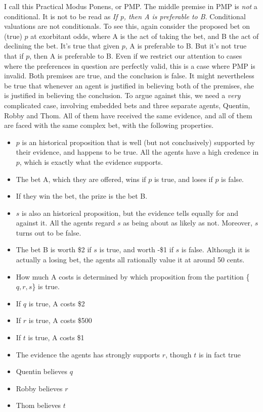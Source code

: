 \noindent I call this Practical Modus Ponens, or PMP. The middle premise in PMP is \textit{not} a conditional. It is not to be read as \textit{If p, then A is preferable to B}. Conditional valuations are not conditionals. To see this, again consider the proposed bet on (true) \(p\) at exorbitant odds, where A is the act of taking the bet, and B the act of declining the bet. It's true that given \(p\), A is preferable to B. But it's not true that if \(p\), then A is preferable to B. Even if we restrict our attention to cases where the preferences in question are perfectly valid, this is a case where PMP is invalid. Both premises are true, and the conclusion is false. It might nevertheless be true that whenever an agent is justified in believing both of the premises, she is justified in believing the conclusion. To argue against this, we need a \textit{very} complicated case, involving embedded bets and three separate agents, Quentin, Robby and Thom. All of them have received the same evidence, and all of them are faced with the same complex bet, with the following properties.

\begin{itemize}
\item \(p\) is an historical proposition that is well (but not conclusively) supported by their evidence, and happens to be true. All the agents have a high credence in \(p\), which is exactly what the evidence supports.
\item The bet A, which they are offered, wins if \(p\) is true, and loses if \(p\) is false.
\item If they win the bet, the prize is the bet B.
\item \(s\) is also an historical proposition, but the evidence tells equally for and against it. All the agents regard \(s\) as being about as likely as not. Moreover, \(s\) turns out to be false.
\item The bet B is worth \$2 if \(s\) is true, and worth -\$1 if \(s\) is false. Although it is actually a losing bet, the agents all rationally value it at around 50 cents.
\item How much A costs is determined by which proposition from the partition \{\(q, r, s\)\} is true.
\item If \(q\) is true, A costs \$2
\item If \(r\) is true, A costs \$500
\item If \(t\) is true, A costs \$1
\item The evidence the agents has strongly supports \(r\), though \(t\) is in fact true
\item Quentin believes \(q\)
\item Robby believes \(r\)
\item Thom believes \(t\)
\end{itemize}

